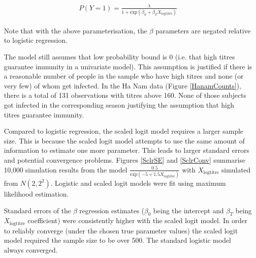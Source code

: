 \documentclass[12pt]{article}
\begin{document}
\begin{align*}
\begin{gathered}
P(Y=1) = \frac{\lambda}{1 + \text{exp}(\beta_0 + \beta_T X_{\text{logtitre}})}
\end{gathered}
\end{align*}

Note that with the above parameterisation, the $\beta$ parameters are negated relative to logistic regression.

The model still assumes that low probability bound is 0 (i.e. that high titres guarantee immunity in a univariate model). This assumption is justified if there is a reasonable number of people in the sample who have high titres and none (or very few) of whom get infected. In the Ha Nam data (Figure \ref{HanamCounts}), there is a total of 131 observations with titres above 160. None of those subjects got infected in the corresponding season justifying the assumption that high titres guarantee immunity.

Compared to logistic regression, the scaled logit model requires a larger sample size. This is because the scaled logit model attempts to use the same amount of information to estimate one more parameter. This leads to larger standard errors and potential convergence problems. Figures \ref{SclrSE} and \ref{SclrConv} summarise 10,000 simulation results from the model $\frac{0.5}{\text{exp}(-5 + 1.5 X_{\text{logtitre}})}$ with $X_{\text{logtitre}}$ simulated from $N(2, 2^2)$. Logistic and scaled logit models were fit using maximum likelihood estimation. 

Standard errors of the $\beta$ regression estimates ($\beta_0$ being the intercept and $\beta_T$ being $X_{\text{logtitre}}$ coefficient) were consistently higher with the scaled logit model. In order to reliably converge (under the chosen true parameter values) the scaled logit model required the sample size to be over 500. The standard logistic model always converged.

\end{document}
